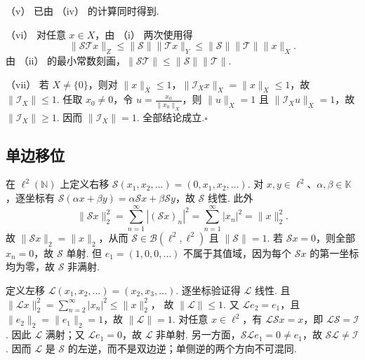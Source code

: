 \begin{FAProof}
（v） 已由 （iv） 的计算同时得到.

（vi） 对任意 \(\displaystyle x\in X\)，由 （i） 两次使用得
\[
\|\mathcal S\mathcal T x\|_Z
\leqslant\|\mathcal S\|\|\mathcal T x\|_Y
\leqslant\|\mathcal S\|\|\mathcal T\|\|x\|_X.
\]
由 （ii） 的最小常数刻画，\(\displaystyle \|\mathcal S\mathcal T\|\leqslant\|\mathcal S\|\|\mathcal T\|\).

（vii） 若 \(\displaystyle X\neq\{0\}\)，则对 \(\displaystyle \|x\|_X\leqslant1\)，\(\displaystyle \|\mathcal I_Xx\|_X=\|x\|_X\leqslant1\)，故 \(\displaystyle \|\mathcal I_X\|\leqslant1\). 任取 \(\displaystyle x_0\neq0\)，令 \(\displaystyle u=\frac{x_0}{\|x_0\|_X}\)，则 \(\displaystyle \|u\|_X=1\) 且 \(\displaystyle \|\mathcal I_Xu\|_X=1\)，故 \(\displaystyle \|\mathcal I_X\|\geqslant1\). 因而 \(\displaystyle \|\mathcal I_X\|=1\). 全部结论成立.\hfill\(\square\)
\end{FAProof}

\subsection{单边移位}

\begin{FAExample}[右移与左移]\label{i05:ex-shift}
在 \(\displaystyle \ell^2(\mathbb N)\) 上定义右移 \(\displaystyle \mathcal S(x_1,x_2,\dots)=(0,x_1,x_2,\dots)\).
对 \(\displaystyle x,y\in\ell^2\)、\(\displaystyle \alpha,\beta\in\mathbb K\)，逐坐标有 \(\displaystyle \mathcal S(\alpha x+\beta y)=\alpha\mathcal Sx+\beta\mathcal Sy\)，故 \(\displaystyle \mathcal S\) 线性. 此外
\[
\|\mathcal Sx\|_2^2
=\sum_{n=1}^{\infty}|(\mathcal Sx)_n|^2
=\sum_{n=1}^{\infty}|x_n|^2
=\|x\|_2^2.
\]
故 \(\displaystyle \|\mathcal Sx\|_2=\|x\|_2\)，从而 \(\displaystyle \mathcal S\in\mathcal B(\ell^2,\ell^2)\) 且 \(\displaystyle \|\mathcal S\|=1\). 若 \(\displaystyle \mathcal Sx=0\)，则全部 \(\displaystyle x_n=0\)，故 \(\displaystyle \mathcal S\) 单射. 但 \(\displaystyle e_1=(1,0,0,\dots)\) 不属于其值域，因为每个 \(\displaystyle \mathcal Sx\) 的第一坐标均为零，故 \(\displaystyle \mathcal S\) 非满射.

定义左移 \(\displaystyle \mathcal L(x_1,x_2,\dots)=(x_2,x_3,\dots)\).
逐坐标验证得 \(\displaystyle \mathcal L\) 线性. 且 \(\displaystyle \|\mathcal Lx\|_2^2 =\sum_{n=2}^{\infty}|x_n|^2 \leqslant\|x\|_2^2\)，
故 \(\displaystyle \|\mathcal L\|\leqslant1\). 又 \(\displaystyle \mathcal Le_2=e_1\)，且 \(\displaystyle \|e_2\|_2=\|e_1\|_2=1\)，故 \(\displaystyle \|\mathcal L\|=1\). 对任意 \(\displaystyle x\in\ell^2\)，有 \(\displaystyle \mathcal L\mathcal Sx=x\)，即 \(\displaystyle \mathcal L\mathcal S=\mathcal I\). 因此 \(\displaystyle \mathcal L\) 满射；又 \(\displaystyle \mathcal Le_1=0\)，故 \(\displaystyle \mathcal L\) 非单射. 另一方面，\(\displaystyle \mathcal S\mathcal Le_1=0\neq e_1\)，故 \(\displaystyle \mathcal S\mathcal L\neq\mathcal I\). 因而 \(\displaystyle \mathcal L\) 是 \(\displaystyle \mathcal S\) 的左逆，而不是双边逆；单侧逆的两个方向不可混同.
\end{FAExample}

